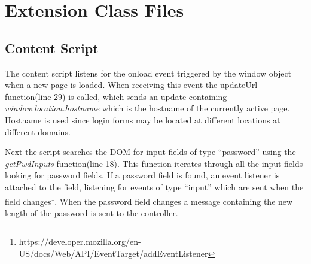\chapter{Extension Class Files}\label{extension-classes}

\section{Content Script}\label{app:content-script}


The content script listens for the onload event triggered by the window object when a new page is loaded. When receiving this event the updateUrl function(line 29) is called, which sends an update containing  \emph{window.location.hostname} which is the hostname of the currently active page. Hostname is used since login forms may be located at different locations at different domains.
\par Next the script searches the DOM for input fields of type ``password'' using the \emph{getPwdInputs} function(line 18). This function iterates through all the input fields looking for password fields. If a password field is found, an event listener is attached to the field, listening for events of type ``input'' which are sent when the field changes\footnote{https://developer.mozilla.org/en-US/docs/Web/API/EventTarget/addEventListener}. When the password field changes a message containing the new length of the password is sent to the controller. 

